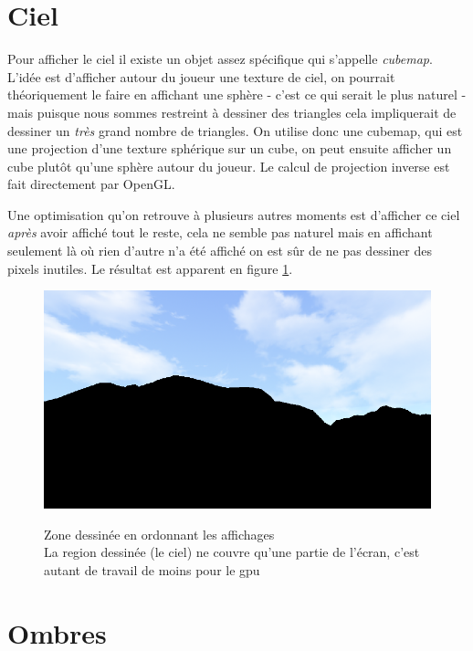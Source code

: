 \documentclass{EPUProjetDi}
\begin{document}
\section{Ciel}
\label{sec:sky}

Pour afficher le ciel il existe un objet assez spécifique qui s'appelle \textit{cubemap}. L'idée est d'afficher autour du joueur une texture de ciel, on pourrait théoriquement le faire en affichant une sphère - c'est ce qui serait le plus naturel - mais puisque nous sommes restreint à dessiner des triangles cela impliquerait de dessiner un \textit{très} grand nombre de triangles. On utilise donc une cubemap, qui est une projection d'une texture sphérique sur un cube, on peut ensuite afficher un cube plutôt qu'une sphère autour du joueur. Le calcul de projection inverse est fait directement par OpenGL.

Une optimisation qu'on retrouve à plusieurs autres moments est d'afficher ce ciel \textit{après} avoir affiché tout le reste, cela ne semble pas naturel mais en affichant seulement là où rien d'autre n'a été affiché on est sûr de ne pas dessiner des pixels inutiles. Le résultat est apparent en figure \ref{fig:sky_depth_test}.

\begin{figure}
	\centering
	\caption[Zone dessinée en ordonnant les affichages]{Zone dessinée en ordonnant les affichages\\La region dessinée (le ciel) ne couvre qu'une partie de l'écran, c'est autant de travail de moins pour le gpu}
	\includegraphics[scale=.45]{sky_depth_test}
	\label{fig:sky_depth_test}
\end{figure}

\section{Ombres}
\end{document}
